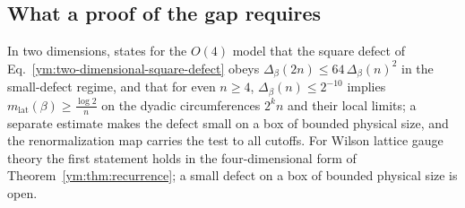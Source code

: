 \subsection{What a proof of the gap requires}
In two dimensions, \cite{OpenAIO4Sharp2026} states for the $O(4)$ model that
the square defect of Eq.~\eqref{ym:two-dimensional-square-defect} obeys
$\Delta_\beta(2n)\le64\,\Delta_\beta(n)^2$ in the small-defect regime, and that
for even $n\ge4$, $\Delta_\beta(n)\le2^{-10}$ implies
$m_{\mathrm{lat}}(\beta)\ge\frac{\log2}{n}$ on the dyadic circumferences
$2^kn$ and their local limits; a separate estimate makes the defect small on
a box of bounded physical size, and the renormalization map carries the test
to all cutoffs. For Wilson lattice gauge theory the first statement holds in
the four-dimensional form of Theorem~\ref{ym:thm:recurrence}; a small defect
on a box of bounded physical size is open.


